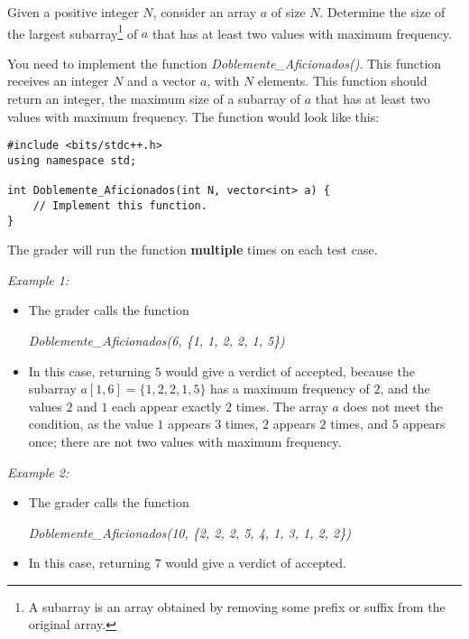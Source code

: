 \documentclass[12pt]{scrartcl}
\begin{document}
    
    
    \vspace{10pt}

    
    
        Given a positive integer $N$, consider an array $a$ of size $N$. Determine the size of the largest subarray\footnote{A subarray is an array obtained by removing some prefix or suffix from the original array.} of $a$ that has at least two values with maximum frequency. 
    

       You need to implement the function \textit{Doblemente\_Aficionados()}. This function receives an integer $N$ and a vector $a$, with $N$ elements. This function should return an integer, the maximum size of a subarray of $a$ that has at least two values with maximum frequency.
        The function would look like this:

\begin{verbatim}
#include <bits/stdc++.h>
using namespace std;

int Doblemente_Aficionados(int N, vector<int> a) {
    // Implement this function.
}
\end{verbatim}

    The grader will run the function \textbf{multiple} times on each test case.

    
        {\itshape Example 1:}
        \begin{itemize}
            \item The grader calls the function 

            \begin{center}
                {\itshape Doblemente\_Aficionados(6, \{1, 1, 2, 2, 1, 5\})}
            \end{center}
            
            \item In this case, returning $5$ would give a verdict of accepted, because the subarray $a[1, 6] = \{1, 2, 2, 1, 5\}$ has a maximum frequency of $2$, and the values $2$ and $1$ each appear exactly $2$ times. The array $a$ does not meet the condition, as the value $1$ appears $3$ times, $2$ appears $2$ times, and $5$ appears once; there are not two values with maximum frequency. 
        \end{itemize}
        
        {\itshape Example 2:}
        \begin{itemize}
            \item The grader calls the function 
            
            \begin{center}
                {\itshape Doblemente\_Aficionados(10, \{2, 2, 2, 5, 4, 1, 3, 1, 2, 2\})}
            \end{center}

            \item In this case, returning $7$ would give a verdict of accepted.
        \end{itemize}
        
\end{document}
